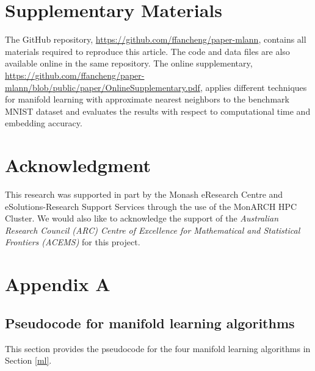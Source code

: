 \documentclass{article}
\begin{document}
\hypertarget{supplementary-materials}{%
\section*{Supplementary Materials}\label{supplementary-materials}}

The GitHub repository, \url{https://github.com/ffancheng/paper-mlann},
contains all materials required to reproduce this article. The code and
data files are also available online in the same repository. The online
supplementary,
\url{https://github.com/ffancheng/paper-mlann/blob/public/paper/OnlineSupplementary.pdf},
applies different techniques for manifold learning with approximate
nearest neighbors to the benchmark MNIST dataset and evaluates the
results with respect to computational time and embedding accuracy.

\hypertarget{acknowledgment}{%
\section*{Acknowledgment}\label{acknowledgment}}

This research was supported in part by the Monash eResearch Centre and
eSolutions-Research Support Services through the use of the MonARCH HPC
Cluster. We would also like to acknowledge the support of the
\emph{Australian Research Council (ARC) Centre of Excellence for
Mathematical and Statistical Frontiers (ACEMS)} for this project.




\clearpage\appendix
\section{Appendix A}

\subsection{Pseudocode for manifold learning algorithms}
\label{sec:mlalg}
This section provides the pseudocode for the four manifold learning algorithms in Section \ref{ml}.
\end{document}
